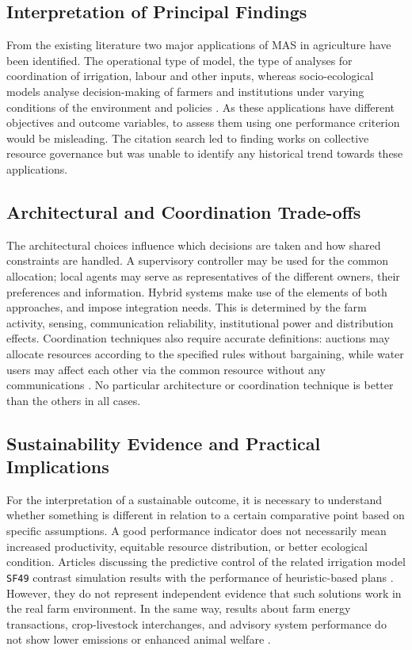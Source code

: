 \documentclass[11pt,a4paper]{article}
\begin{document}
\subsection{Interpretation of Principal Findings}

From the existing literature two major applications of MAS in agriculture have been identified. The operational type of model, the type of analyses for coordination of irrigation, labour and other inputs, whereas socio-ecological models analyse decision-making of farmers and institutions under varying conditions of the environment and policies \parencite{chiewchan_improving_2020,berger_agent-based_2001,therond_integrated_2014}. As these applications have different objectives and outcome variables, to assess them using one performance criterion would be misleading. The citation search led to finding works on collective resource governance but was unable to identify any historical trend towards these applications.

\subsection{Architectural and Coordination Trade-offs}

The architectural choices influence which decisions are taken and how shared constraints are handled. A supervisory controller may be used for the common allocation; local agents may serve as representatives of the different owners, their preferences and information. Hybrid systems make use of the elements of both approaches, and impose integration needs. This is determined by the farm activity, sensing, communication reliability, institutional power and distribution effects. Coordination techniques also require accurate definitions: auctions may allocate resources according to the specified rules without bargaining, while water users may affect each other via the common resource without any communications \parencite{feuillette_sinuse_2003,becu_agent_2003,shah_peer--peer_2024}. No particular architecture or coordination technique is better than the others in all cases.

\subsection{Sustainability Evidence and Practical Implications}

For the interpretation of a sustainable outcome, it is necessary to understand whether something is different in relation to a certain comparative point based on specific assumptions. A good performance indicator does not necessarily mean increased productivity, equitable resource distribution, or better ecological condition. Articles discussing the predictive control of the related irrigation model \texttt{SF49} contrast simulation results with the
performance of heuristic-based plans \parencite{cobbenhagen_optimal_2022,
schoonen_optimal_2019}. However, they do not represent independent
evidence that such solutions work in the real farm environment. In the
same way, results about farm energy transactions, crop-livestock
interchanges, and advisory system performance do not show lower emissions or enhanced animal welfare \parencite{catarino_fostering_2021,t_shanteer_cownet-ai_2026}.
\end{document}
